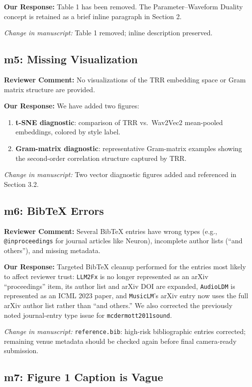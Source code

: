 \documentclass[11pt]{article}
\newcommand{\reviewer}[1]{\textcolor{reviewercolor}{\textbf{Reviewer Comment:} #1}}
\newcommand{\response}[1]{\textcolor{responsecolor}{\textbf{Our Response:} #1}}
\newcommand{\change}[1]{\textit{Change in manuscript:} #1}
\begin{document}
\response{Table 1 has been removed. The Parameter--Waveform Duality concept is retained as a brief inline paragraph in Section 2.}

\change{Table 1 removed; inline description preserved.}

\subsection*{m5: Missing Visualization}

\reviewer{No visualizations of the TRR embedding space or Gram matrix structure are provided.}

\response{We have added two figures:}
\begin{enumerate}[leftmargin=*]
\item \textbf{t-SNE diagnostic}: comparison of TRR vs.\ Wav2Vec2 mean-pooled embeddings, colored by style label.
\item \textbf{Gram-matrix diagnostic}: representative Gram-matrix examples showing the second-order correlation structure captured by TRR.
\end{enumerate}

\change{Two vector diagnostic figures added and referenced in Section 3.2.}

\subsection*{m6: BibTeX Errors}

\reviewer{Several BibTeX entries have wrong types (e.g., \texttt{@inproceedings} for journal articles like Neuron), incomplete author lists (``and others''), and missing metadata.}

\response{Targeted BibTeX cleanup performed for the entries most likely to affect reviewer trust: \texttt{LLM2Fx} is no longer represented as an arXiv ``proceedings'' item, its author list and arXiv DOI are expanded, \texttt{AudioLDM} is represented as an ICML 2023 paper, and \texttt{MusicLM}'s arXiv entry now uses the full arXiv author list rather than ``and others.'' We also corrected the previously noted journal-entry type issue for \texttt{mcdermott2011sound}.}

\change{\texttt{reference.bib}: high-risk bibliographic entries corrected; remaining venue metadata should be checked again before final camera-ready submission.}

\subsection*{m7: Figure 1 Caption is Vague}
\end{document}
